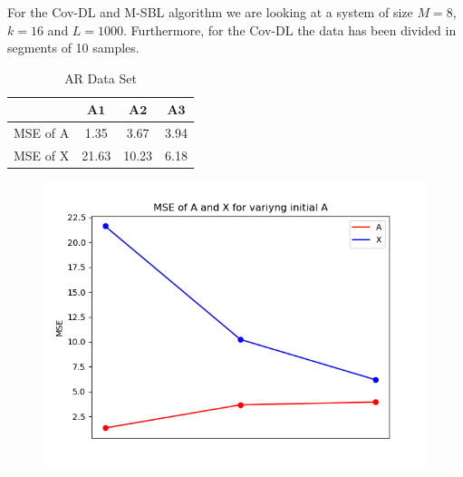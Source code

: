 For the Cov-DL and M-SBL algorithm we are looking at a system of size $M = 8$, $k = 16$ and $L = 1000$. Furthermore, for the Cov-DL the data has been divided in segments of 10 samples.
\begin{table}[H]
\centering
\begin{tabular}{|c|c|c|c|}
\hline 
 & $\mathbf{A1}$ & $\mathbf{A2}$ & $\mathbf{A3}$ \\ 
\hline 
MSE of A & 1.35 & 3.67 & 3.94 \\ 
\hline 
MSE of X & 21.63 & 10.23 & 6.18 \\ 
\hline
\end{tabular} 
\caption{AR Data Set}
\end{table}

\begin{figure}[H]
\centering
\includegraphics[scale=0.5]{figures/chapter6/AR_Error_initial_A_m8_k16_L1000.png}
\label{fig:initialA_AR}
\caption{}
\end{figure}
\noindent



%


